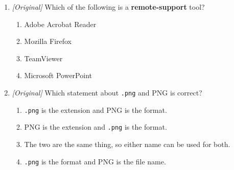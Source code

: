 \begin{enumerate}[label=\textbf{Q\arabic*.}, leftmargin=*]
\begin{enumerate}[label=\Alph*.]
    \item (i)-b, (ii)-c, (iii)-a, (iv)-d
  \end{enumerate}
\item \textit{[Original]} Which of the following is a
  \textbf{remote-support} tool?
  \begin{enumerate}[label=\Alph*.]
    \item Adobe Acrobat Reader
    \item Mozilla Firefox
    \item TeamViewer
    \item Microsoft PowerPoint
  \end{enumerate}
\item \textit{[Original]} Which statement about \texttt{.png} and PNG is
  correct?
  \begin{enumerate}[label=\Alph*.]
    \item \texttt{.png} is the extension and PNG is the format.
    \item PNG is the extension and \texttt{.png} is the format.
    \item The two are the same thing, so either name can be used for both.
    \item \texttt{.png} is the format and PNG is the file name.
  \end{enumerate}


\end{enumerate}
